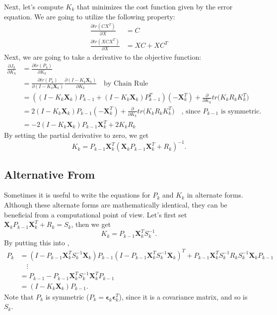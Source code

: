 Next, let's compute $K_k$ that minimizes the cost function given by the error equation. We are going to utilize the following property:
\begin{align*}
	\frac{\partial tr(CX^T)}{\partial X} &= C\\
	\frac{\partial tr(XCX^T)}{\partial X} &= XC + XC^T
\end{align*}
Next, we are going to take a derivative to the objective function:
\begin{align*}
	\frac{\partial J_k}{\partial K_k} &= \frac{\partial tr(P_k)}{\partial K_k}\\ 
									  &= \frac{\partial tr(P_k)}{\partial (I-K_k \mathbf{X}_k)}\frac{\partial (I-K_k \mathbf{X}_k)}{\partial K_k}\quad \text{by Chain Rule}\\
	&= \left((I-K_k \mathbf{X}_k)P_{k-1}+ (I-K_k \mathbf{X}_k)P_{k-1}^T\right)(-\mathbf{X}_k^T)+ \frac{\partial}{\partial K_k}tr\big(K_k R_k K_k^T\big)\\
	&= 2(I-K_k \mathbf{X}_k)P_{k-1}(-\mathbf{X}_k^T) + \frac{\partial}{\partial K_k}tr\big(K_k R_k K_k^T\big)\quad \text{, since } P_{k-1} \text{ is symmetric.}\\
									  &= -2(I-K_k \mathbf{X}_k)P_{k-1}\mathbf{X}_k^T+2K_kR_k
\end{align*}
By setting the partial derivative to zero, we get
$$K_k = P_{k-1}\mathbf{X}_k^T(\mathbf{X}_kP_{k-1}\mathbf{X}_k^T+R_k)^{-1}.$$

\subsection{Alternative From}
Sometimes it is useful to write the equations for $P_k$ and $K_k$ in alternate forms. Although these alternate forms are mathematically identical, they can be beneficial from a computational point of view. Let's first set $\mathbf{X}_kP_{k-1}\mathbf{X}_k^T+R_k = S_k$, then we get 
$$K_k = P_{k-1}\mathbf{X}_k^TS_k^{-1}.$$
By putting this into ,
\begin{align*}
	P_k &= (I-P_{k-1}\mathbf{X}_k^TS_k^{-1} \mathbf{X}_k)P_{k-1}(I-P_{k-1}\mathbf{X}_k^TS_k^{-1} \mathbf{X}_k)^T+P_{k-1}\mathbf{X}_k^TS_k^{-1} R_k S_k^{-1}\mathbf{X}_kP_{k-1}\\ 
		&\quad \vdots\\
		&= P_{k-1}-P_{k-1}\mathbf{X}_k^TS_k^{-1}\mathbf{X}_k^TP_{k-1}\\
		&= (I-K_k\mathbf{X}_k)P_{k-1}.
\end{align*}
Note that $P_k$ is symmetric (\cf $P_k=\boldsymbol{\epsilon}_{k}\boldsymbol{\epsilon}_{k}^T$), since it is a covariance matrix, and so is $S_k$.

